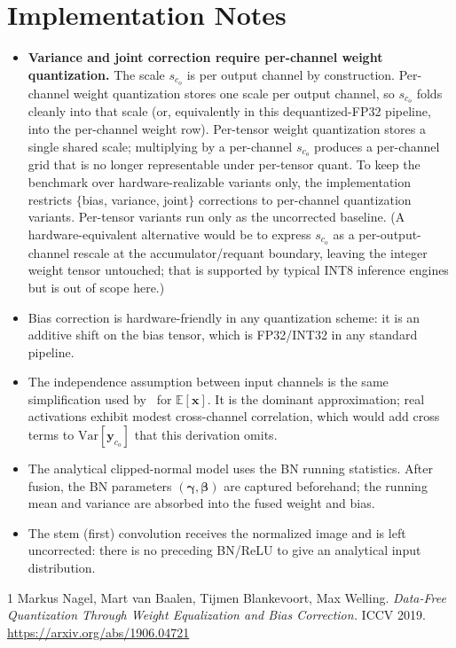 \documentclass[11pt,a4paper]{article}
\newcommand{\xx}{\mathbf{x}}
\newcommand{\y}{\mathbf{y}}
\newcommand{\bgam}{\boldsymbol{\gamma}}
\newcommand{\bbet}{\boldsymbol{\beta}}
\newcommand{\E}{\mathbb{E}}
\newcommand{\Var}{\mathrm{Var}}
\begin{document}
\section{Implementation Notes}

\begin{itemize}
\item \textbf{Variance and joint correction require per-channel weight quantization.} The scale $s_{c_o}$ is per output channel by construction. Per-channel weight quantization stores one scale per output channel, so $s_{c_o}$ folds cleanly into that scale (or, equivalently in this dequantized-FP32 pipeline, into the per-channel weight row). Per-tensor weight quantization stores a single shared scale; multiplying by a per-channel $s_{c_o}$ produces a per-channel grid that is no longer representable under per-tensor quant. To keep the benchmark over hardware-realizable variants only, the implementation restricts $\{$bias, variance, joint$\}$ corrections to per-channel quantization variants. Per-tensor variants run only as the uncorrected baseline. (A hardware-equivalent alternative would be to express $s_{c_o}$ as a per-output-channel rescale at the accumulator/requant boundary, leaving the integer weight tensor untouched; that is supported by typical INT8 inference engines but is out of scope here.)
\item Bias correction is hardware-friendly in any quantization scheme: it is an additive shift on the bias tensor, which is FP32/INT32 in any standard pipeline.
\item The independence assumption between input channels is the same simplification used by~\cite{nagel2019} for $\E[\xx]$. It is the dominant approximation; real activations exhibit modest cross-channel correlation, which would add cross terms to $\Var[\y_{c_o}]$ that this derivation omits.
\item The analytical clipped-normal model uses the BN running statistics. After fusion, the BN parameters $(\bgam,\bbet)$ are captured beforehand; the running mean and variance are absorbed into the fused weight and bias.
\item The stem (first) convolution receives the normalized image and is left uncorrected: there is no preceding BN/ReLU to give an analytical input distribution.
\end{itemize}

\begin{thebibliography}{1}
Markus Nagel, Mart van Baalen, Tijmen Blankevoort, Max Welling.
\emph{Data-Free Quantization Through Weight Equalization and Bias Correction.}
ICCV 2019. \url{https://arxiv.org/abs/1906.04721}
\end{thebibliography}
\end{document}
